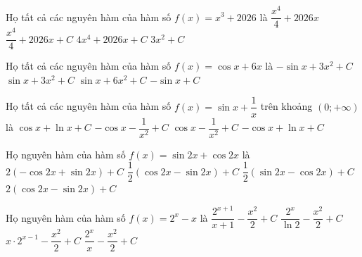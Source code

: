 \begin{ex}%
 	Họ tất cả các nguyên hàm của hàm số $f(x) = x^3 + 2026$ là
 	\choice
 	{$\dfrac{x^4}{4} + 2026x$}
 	{\True $\dfrac{x^4}{4} + 2026x + C$}
 	{$4x^4 + 2026x + C$}
 	{$3x^2 + C$}
 \end{ex}

\begin{ex}%
	Họ tất cả các nguyên hàm của hàm số $f(x) = \cos x + 6x$ là
	\choice
	{$-\sin x + 3x^2 + C$}
	{\True $\sin x + 3x^2 + C$}
	{$\sin x + 6x^2 + C$}
	{$-\sin x + C$}
\end{ex}

\begin{ex}%
	Họ tất cả các nguyên hàm của hàm số $f(x)=\sin x+\dfrac{1}{x}$ trên khoảng $(0;+\infty)$ là
	\choice
	{$\cos x+\ln x+C$}
	{$-\cos x-\dfrac{1}{x^2}+C$}
	{$\cos x-\dfrac{1}{x^2}+C$}
	{\True $-\cos x+\ln x+C$}
\end{ex}

\begin{ex}%
	Họ nguyên hàm của hàm số $f(x)=\sin 2x+\cos 2x$ là
	\choice
	{$2(-\cos 2x+\sin 2x)+C$}
	{$\dfrac{1}{2}(\cos 2x-\sin 2x)+C$}
	{\True $\dfrac{1}{2}(\sin 2x-\cos 2x)+C$}
	{$2(\cos 2x-\sin 2x)+C$}
\end{ex}

\begin{ex}%
	Họ nguyên hàm của hàm số $f(x) = 2^x - x$ là  
	\choice
	{$\dfrac{2^{x+1}}{x+1} - \dfrac{x^2}{2} + C$}  
	{\True $\dfrac{2^x}{\ln 2} - \dfrac{x^2}{2} + C$}  
	{$x\cdot 2^{x-1} - \dfrac{x^2}{2} + C$}  
	{$\dfrac{2^x}{x} - \dfrac{x^2}{2} + C$}  
\end{ex}

